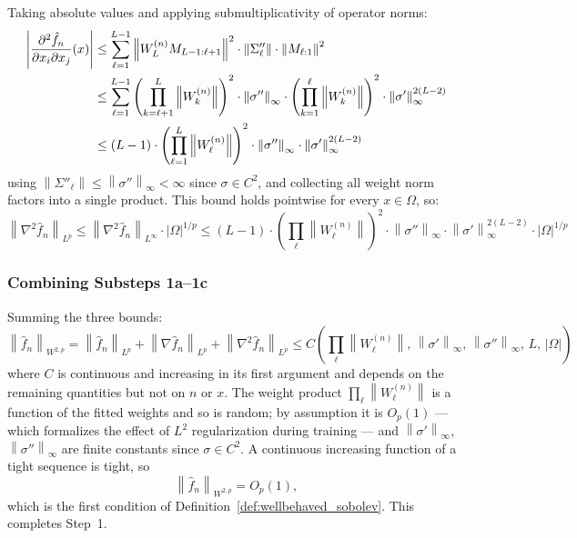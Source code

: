 \documentclass[12pt,a4paper]{article}
\numberwithin{equation}{section}
\theoremstyle{plain}
\theoremstyle{definition}
\newcommand{\norm}[1]{\left\| #1 \right\|}
\newcommand{\fn}{\hat{f}_n}
\newcommand{\abs}[1]{\left| #1 \right|}
\begin{document}
	Taking absolute values and applying submultiplicativity of operator norms:
	\begin{align}
		\abs{\frac{\partial^2 \fn}{\partial x_i \partial x_j}(x)}
		&\leq \sum_{\ell=1}^{L-1}
		\norm{W_L^{(n)} M_{L-1:\ell+1}}^2 \cdot
		\norm{\Sigma''_\ell} \cdot
		\norm{M_{\ell:1}}^2 \notag \\
		&\leq \sum_{\ell=1}^{L-1}
		\left(\prod_{k=\ell+1}^{L} \norm{W_k^{(n)}}\right)^2 \cdot
		\norm{\sigma''}_\infty \cdot
		\left(\prod_{k=1}^{\ell} \norm{W_k^{(n)}}\right)^2 \cdot
		\norm{\sigma'}_\infty^{2(L-2)} \notag \\
		&\leq (L-1) \cdot \left(\prod_{\ell=1}^{L} \norm{W_\ell^{(n)}}\right)^2
		\cdot \norm{\sigma''}_\infty \cdot \norm{\sigma'}_\infty^{2(L-2)}
	\end{align}
	using $\norm{\Sigma''_\ell} \leq \norm{\sigma''}_\infty < \infty$ since
	$\sigma \in C^2$, and collecting all weight norm factors into a single
	product. This bound holds pointwise for every $x \in \Omega$, so:
	\begin{equation}
		\norm{\nabla^2 \fn}_{L^p}
		\leq \norm{\nabla^2 \fn}_{L^\infty} \cdot |\Omega|^{1/p}
		\leq (L-1) \cdot \left(\prod_\ell \norm{W_\ell^{(n)}}\right)^2
		\cdot \norm{\sigma''}_\infty \cdot \norm{\sigma'}_\infty^{2(L-2)}
		\cdot |\Omega|^{1/p}
	\end{equation}
	
	\subsubsection*{Combining Substeps 1a--1c}
	
	Summing the three bounds:
	\begin{equation}
		\norm{\fn}_{W^{2,p}}
		= \norm{\fn}_{L^p} + \norm{\nabla \fn}_{L^p} + \norm{\nabla^2 \fn}_{L^p}
		\leq C\!\left(\prod_\ell \norm{W_\ell^{(n)}},\,
		\norm{\sigma'}_\infty,\, \norm{\sigma''}_\infty,\, L,\, |\Omega|\right)
	\end{equation}
	where $C$ is continuous and increasing in its first argument and depends on
	the remaining quantities but not on $n$ or $x$. The weight product
	$\prod_\ell \norm{W_\ell^{(n)}}$ is a function of the fitted weights and so
	is random; by assumption it is $O_p(1)$ --- which formalizes the effect of
	$L^2$ regularization during training \citep{bartlett2017spectrally} --- and
	$\norm{\sigma'}_\infty$, $\norm{\sigma''}_\infty$ are finite constants since
	$\sigma \in C^2$. A continuous increasing function of a tight sequence is
	tight, so
	\begin{equation}
		\norm{\fn}_{W^{2,p}} = O_p(1) ,
	\end{equation}
	which is the first condition of Definition~\ref{def:wellbehaved_sobolev}.
	This completes Step~1.
	
\end{document}
